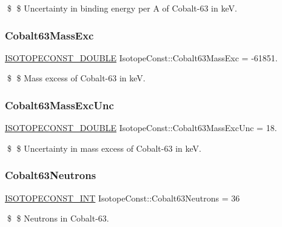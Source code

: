 \$ \$ Uncertainty in binding energy per A of Cobalt-\/63 in keV. \mbox{\label{group___isotope_const-_cobalt-_co63_ga538eb966cb343bbbfe5d2d65af4da1f3}} 
\subsubsection{\texorpdfstring{Cobalt63\+Mass\+Exc}{Cobalt63MassExc}}
{\footnotesize\ttfamily \mbox{\hyperlink{group___isotope_const-_macros_ga8f45a7272ce02c0b4c65c44636ed719a}{I\+S\+O\+T\+O\+P\+E\+C\+O\+N\+S\+T\+\_\+\+D\+O\+U\+B\+LE}} Isotope\+Const\+::\+Cobalt63\+Mass\+Exc = -\/61851.}

\$ \$ Mass excess of Cobalt-\/63 in keV. \mbox{\label{group___isotope_const-_cobalt-_co63_gae5bcd6a96f13e858f6c7b59a419ad357}} 
\subsubsection{\texorpdfstring{Cobalt63\+Mass\+Exc\+Unc}{Cobalt63MassExcUnc}}
{\footnotesize\ttfamily \mbox{\hyperlink{group___isotope_const-_macros_ga8f45a7272ce02c0b4c65c44636ed719a}{I\+S\+O\+T\+O\+P\+E\+C\+O\+N\+S\+T\+\_\+\+D\+O\+U\+B\+LE}} Isotope\+Const\+::\+Cobalt63\+Mass\+Exc\+Unc = 18.}

\$ \$ Uncertainty in mass excess of Cobalt-\/63 in keV. \mbox{\label{group___isotope_const-_cobalt-_co63_ga770bac7c69efa0ba27ff009df215ad0d}} 
\subsubsection{\texorpdfstring{Cobalt63\+Neutrons}{Cobalt63Neutrons}}
{\footnotesize\ttfamily \mbox{\hyperlink{group___isotope_const-_macros_ga5f18360b3e99483a35c32d789e62621c}{I\+S\+O\+T\+O\+P\+E\+C\+O\+N\+S\+T\+\_\+\+I\+NT}} Isotope\+Const\+::\+Cobalt63\+Neutrons = 36}

\$ \$ Neutrons in Cobalt-\/63. \mbox{\label{group___isotope_const-_cobalt-_co63_ga76947e1725e616a8b8a73e3b2cb81363}} 
